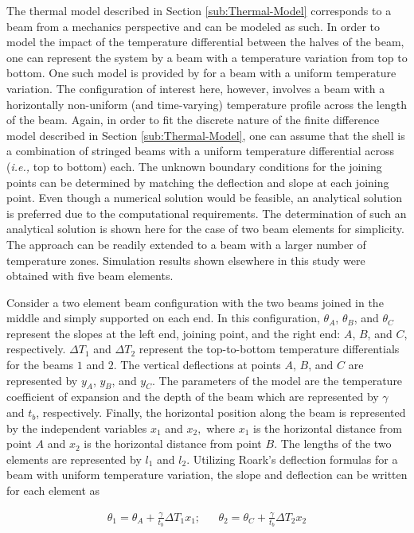 \documentclass[a4paper, 10pt, conference]{ieeeconf}      %
\begin{document}
The thermal model described in Section \ref{sub:Thermal-Model} corresponds
to a beam from a mechanics perspective and can be modeled as such.
In order to model the impact of the temperature differential between
the halves of the beam, one can represent the system by a beam with a
temperature variation from top to bottom. One such model is provided
by \cite{Roark2002} for a beam with a uniform temperature variation. The configuration
of interest here, however, involves a beam with a horizontally non-uniform (and time-varying) temperature profile
across the length of the beam. Again, in order to fit the discrete
nature of the finite difference model described in Section \ref{sub:Thermal-Model},
one can assume that the shell is a combination of stringed beams with
a uniform temperature differential across (\emph{i.e.,} top to bottom)
each. The unknown boundary conditions for the
joining points can be determined by matching the deflection
and slope at each joining point. Even though a numerical solution
would be feasible, an analytical solution is preferred
due to the computational requirements. The determination of such an analytical solution is shown
here for the case of two beam elements for simplicity. The approach
can be readily extended to a beam with a larger number of temperature
zones. Simulation results shown elsewhere in this study were obtained with five beam elements.

Consider a two element beam configuration with the two beams joined in the middle and simply supported on each end. In this configuration, $\theta_{A}$, $\theta_{B}$, and $\theta_{C}$ represent the slopes at the left end, joining point, and the right end: $A$, $B$, and $C$, respectively. $\Delta T_{1}$ and $\Delta T_{2}$ represent the top-to-bottom temperature differentials for the beams $1$ and $2$. The vertical deflections at points $A$, $B$, and
$C$ are represented by $y_{A}$, $y_{B}$, and $y_{C}$. The parameters of the model are the temperature coefficient of expansion and the depth of the beam which are represented by $\gamma$ and $t_{b}$, respectively.
Finally, the horizontal position along the beam is represented by the independent variables $x_{1}$ and $x_{2},$ where $x_{1}$ is the horizontal distance from point $A$ and $x_{2}$ is the horizontal distance from point $B$. The lengths of the two elements are represented by $l_{1}$ and $l_{2}$. Utilizing Roark's deflection formulas for
a beam with uniform temperature variation, the slope and deflection can be written for each element as

\begin{eqnarray*}
\theta_{1}=\theta_{A}+\frac{\gamma}{t_{b}}\Delta T_{1}x_{1}; &  & \theta_{2}=\theta_{C}+\frac{\gamma}{t_{b}}\Delta T_{2}x_{2}
\end{eqnarray*}
\end{document}
